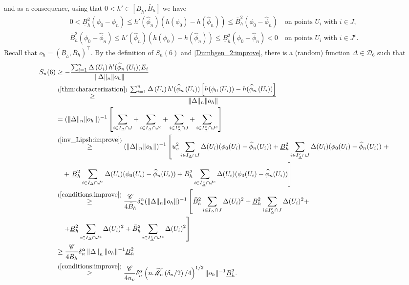 \documentclass{article} %
\def\eqref#1{equation~\ref{#1}}
\renewcommand{\eqref}[1]{(\ref{#1})}
\begin{document}
\noindent
and as a consequence, using that $0<h' \in [\underline{B}_{h},\bar{B}_{h}]$ we have 
\begin{align}\label{inv_Lipsh:improve}
0<\underline{B}_{h}^2(\phi_0 - \widehat{\phi}_n) \leq h'(\widehat{\phi}_n) (h(\phi_0)-h(\widehat{\phi}_n)) \leq \bar{B}_{h}^2(\phi_0 - \widehat{\phi}_n) \quad\text{on points } U_i \text{ with } i \in J, \nonumber \\
\bar{B}_{h}^2(\phi_0 - \widehat{\phi}_n) \leq h'(\widehat{\phi}_n) (h(\phi_0)-h(\widehat{\phi}_n)) \leq \underline{B}_{h}^2(\phi_0 - \widehat{\phi}_n)<0 \quad\text{on points } U_i \text{ with } i \in J^c.
\end{align}
\noindent
Recall that $o_h = (\underline{B}_{h},\bar{B}_{h})^{\top}$. By the definition of $S_n(6)$ and \cref{Dumbgen_2:improve}, there is a (random) function $\Delta \in \mathcal{D}_6$ such that
$$
\begin{aligned}
S_n(6) & \geq -\frac{\sum_{i=1}^n \Delta\left(U_i\right)h'(\widehat{\phi}_n\left(U_i\right)) E_i}{\|\Delta\|_n \|o_h\|} \\
& \stackrel{\eqref{thm:characterization}}{\geq}\frac{\sum_{i=1}^n \Delta\left(U_i\right)h'(\widehat{\phi}_n\left(U_i\right))  \left[h(\phi_0\left(U_i\right))-h(\widehat{\phi}_n\left(U_i\right))\right]}{\|\Delta\|_n \|o_h\|} \\
& = (\|\Delta\|_n \|o_h\|)^{-1}\left[\sum_{i \in I_{\Delta} \cap J} + \sum_{i \in I_{\Delta} \cap J^c} + \sum_{i \in I_{\Delta}^c \cap J} + \sum_{i \in I_{\Delta}^c \cap J^c} \right]\\
& \stackrel{\eqref{inv_Lipsh:improve}}{\geq}
(\|\Delta\|_n \|o_h\|)^{-1}\left[u_v^2 \sum_{i \in I_{\Delta} \cap J} \Delta(U_i) (\phi_0 (U_i)-\widehat{\phi}_n(U_i))  + \underline{B}_{h}^2 \sum_{i \in I_{\Delta}^c \cap J }\Delta(U_i) (\phi_0 (U_i)-\widehat{\phi}_n(U_i)) \right.+\\
& \quad +\left.\underline{B}_{h}^2 \sum_{i \in I_{\Delta} \cap J^c} \Delta(U_i) (\phi_0 (U_i)-\widehat{\phi}_n(U_i))  + \bar{B}_{h}^2 \sum_{i \in I_{\Delta}^c \cap J^c }\Delta(U_i) (\phi_0 (U_i)-\widehat{\phi}_n(U_i)) \right]\\
& \stackrel{\eqref{conditions:improve}}{\geq}
\frac{\mathscr{C}}{4 \bar{B}_{h}} \delta_n^{\alpha} (\|\Delta\|_n \|o_h\|)^{-1}\left[\bar{B}_{h}^2 \sum_{i \in I_{\Delta} \cap J} \Delta(U_i)^2 + \underline{B}_{h}^2 \sum_{i \in I_{\Delta}^c \cap J }\Delta(U_i)^2 +\right.\\
& \quad \left.+ \underline{B}_{h}^2 \sum_{i \in I_{\Delta} \cap J^c} \Delta(U_i)^2 + \bar{B}_{h}^2 \sum_{i \in I_{\Delta}^c \cap J^c }\Delta(U_i)^2 \right]\\
& \geq \frac{\mathscr{C}}{4 \bar{B}_{h}} \delta_n^{\alpha}\left\|\Delta\right\|_n \|o_h\|^{-1} \underline{B}_{h}^2 \\
& \stackrel{\eqref{conditions:improve}}{\geq}\frac{\mathscr{C}}{4 u_v} \delta_n^{\alpha}\left(n \widetilde{\mathscr{M}}_n\left(\delta_n / 2\right) / 4\right)^{1 / 2}\|o_h\|^{-1}  \underline{B}_{h}^2. 
\end{aligned}
$$
\end{document}

